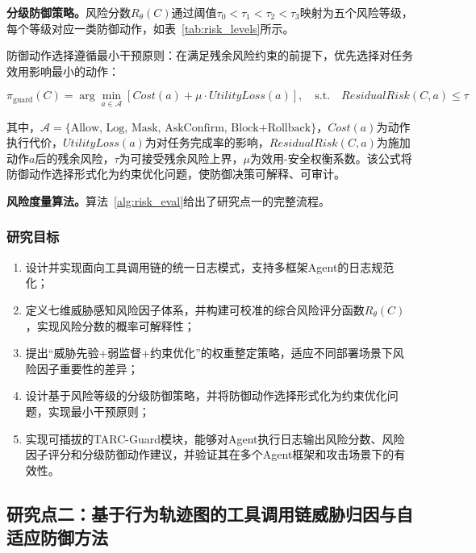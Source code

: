 \textbf{分级防御策略。}风险分数$R_\theta(C)$通过阈值$\tau_0 < \tau_1 < \tau_2 < \tau_3$映射为五个风险等级，每个等级对应一类防御动作，如表~\ref{tab:risk_levels}所示。



防御动作选择遵循最小干预原则：在满足残余风险约束的前提下，优先选择对任务效用影响最小的动作：

\begin{equation}
  \pi_{\text{guard}}(C) = \arg\min_{a \in \mathcal{A}} \left[Cost(a) + \mu \cdot UtilityLoss(a)\right], \quad \text{s.t.} \quad ResidualRisk(C, a) \leq \tau
  \label{eq:guard_action}
\end{equation}

其中，$\mathcal{A} = \{\text{Allow, Log, Mask, AskConfirm, Block+Rollback}\}$，$Cost(a)$为动作执行代价，$UtilityLoss(a)$为对任务完成率的影响，$ResidualRisk(C, a)$为施加动作$a$后的残余风险，$\tau$为可接受残余风险上界，$\mu$为效用-安全权衡系数。该公式将防御动作选择形式化为约束优化问题，使防御决策可解释、可审计。

\textbf{风险度量算法。}算法~\ref{alg:risk_eval}给出了研究点一的完整流程。



\subsubsection{研究目标}

\begin{enumerate}
  \item 设计并实现面向工具调用链的统一日志模式，支持多框架Agent的日志规范化；
  \item 定义七维威胁感知风险因子体系，并构建可校准的综合风险评分函数$R_\theta(C)$，实现风险分数的概率可解释性；
  \item 提出“威胁先验+弱监督+约束优化”的权重整定策略，适应不同部署场景下风险因子重要性的差异；
  \item 设计基于风险等级的分级防御策略，并将防御动作选择形式化为约束优化问题，实现最小干预原则；
  \item 实现可插拔的TARC-Guard模块，能够对Agent执行日志输出风险分数、风险因子评分和分级防御动作建议，并验证其在多个Agent框架和攻击场景下的有效性。
\end{enumerate}

\subsection{研究点二：基于行为轨迹图的工具调用链威胁归因与自适应防御方法}

